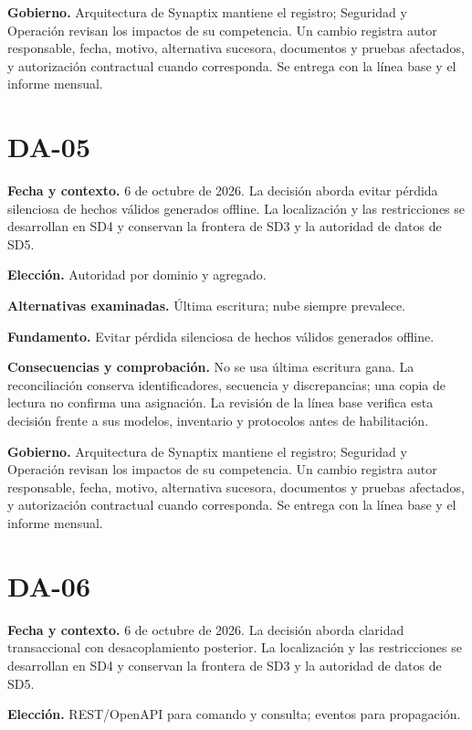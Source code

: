 \documentclass[11pt,letterpaper]{report}
\begin{document}
\textbf{Gobierno.} Arquitectura de Synaptix mantiene el registro; Seguridad y Operación revisan los impactos de su competencia. Un cambio registra autor responsable, fecha, motivo, alternativa sucesora, documentos y pruebas afectados, y autorización contractual cuando corresponda. Se entrega con la línea base y el informe mensual.

\section*{DA-05}

\textbf{Fecha y contexto.} 6 de octubre de 2026. La decisión aborda evitar pérdida silenciosa de hechos válidos generados offline. La localización y las restricciones se desarrollan en SD4 y conservan la frontera de SD3 y la autoridad de datos de SD5.

\textbf{Elección.} Autoridad por dominio y agregado.

\textbf{Alternativas examinadas.} Última escritura; nube siempre prevalece.

\textbf{Fundamento.} Evitar pérdida silenciosa de hechos válidos generados offline.

\textbf{Consecuencias y comprobación.} No se usa última escritura gana. La reconciliación conserva identificadores, secuencia y discrepancias; una copia de lectura no confirma una asignación. La revisión de la línea base verifica esta decisión frente a sus modelos, inventario y protocolos antes de habilitación.

\textbf{Gobierno.} Arquitectura de Synaptix mantiene el registro; Seguridad y Operación revisan los impactos de su competencia. Un cambio registra autor responsable, fecha, motivo, alternativa sucesora, documentos y pruebas afectados, y autorización contractual cuando corresponda. Se entrega con la línea base y el informe mensual.

\section*{DA-06}

\textbf{Fecha y contexto.} 6 de octubre de 2026. La decisión aborda claridad transaccional con desacoplamiento posterior. La localización y las restricciones se desarrollan en SD4 y conservan la frontera de SD3 y la autoridad de datos de SD5.

\textbf{Elección.} REST/OpenAPI para comando y consulta; eventos para propagación.
\end{document}
